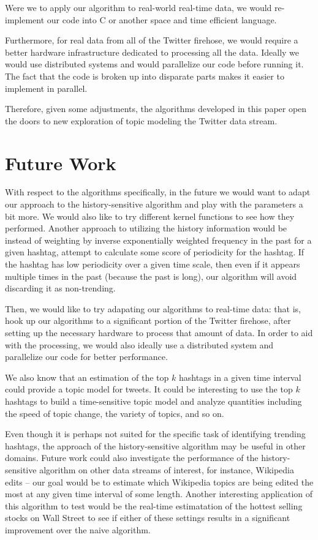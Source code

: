\documentclass[twoside]{article}
\begin{document}
{Were we to apply our algorithm to real-world real-time data, we would re-implement our code into C or another space and time efficient language. 

Furthermore, for real data from all of the Twitter firehose, we would require a better hardware infrastructure dedicated to processing all the data. Ideally we would use distributed systems and would
parallelize our code before running it. The fact that the code is broken up into disparate parts makes it easier to implement in parallel.

Therefore, given some adjustments, the algorithms developed in this paper open the doors to new exploration of topic modeling the Twitter data stream.


\section{Future Work} \label{sec:Future Work}

With respect to the algorithms specifically, in the future we would want to adapt our approach to the history-sensitive algorithm and play with the parameters a bit more. We would also like to try different kernel functions to see how they performed. Another approach to utilizing the history information would be instead of weighting by inverse exponentially weighted frequency in the past for a given hashtag, attempt to calculate some score of periodicity for the hashtag. If the hashtag has low periodicity over a given time scale, then even if it appears multiple times in the past (because the past is long), our algorithm will avoid discarding it as non-trending.

Then, we would like to try adapating our algorithms to real-time data: that is, hook up our algorithms to a significant portion of the Twitter firehose, after setting up the necessary hardware to process that amount of data. In order to aid with the processing, we would also ideally use a distributed system and parallelize
our code for better performance.

We also know that an estimation of the top $k$ hashtags in a given time interval could provide a topic model for tweets. It could be interesting to use the top $k$ hashtags to build a time-sensitive topic model and analyze quantities including the speed of topic change, the variety of topics, and so on.

Even though it is perhaps not suited for the specific task of identifying trending hashtags, 
the approach of the history-sensitive algorithm may be useful in other domains.
Future work could also investigate the performance of the history-sensitive algorithm on other data streams of interest, for instance, Wikipedia edits -- our goal would be to estimate which Wikipedia topics are being edited the most at any given time interval of some length. Another interesting application of this algorithm to test would be the real-time estimatation of the hottest selling stocks on Wall Street to see if either of these settings results in a significant improvement over the naive algorithm.

}
\end{document}
